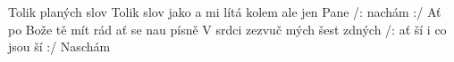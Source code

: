 \begin{TEXT}{Tolik planých slov}
\SLOKA* Tolik  slov jako  a  \NL
mi lítá kolem  \NL
ale  jen Pane   \NL
/: nachám   :/ \NL
Ať po Bože                 tě mít rád \NL
ať se  nau  písně   \NL
V srdci zezvuč mých šest zdných  \NL
/: ať ší i  co jsou ší :/ \NL
Naschám    
\end{TEXT}
